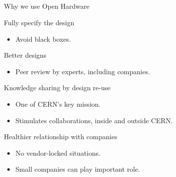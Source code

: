 \documentclass[compress,red]{beamer}
\begin{document}
\subsection*{} %

\begin{frame}{Why we use Open Hardware}

  \begin{block}{Fully specify the design}
    \begin{itemize}
    \item Avoid black boxes.
    \end{itemize}
  \end{block}

  \begin{block}{Better designs}
    \begin{itemize}
    \item Peer review by experts, including companies.
    \end{itemize}
  \end{block}

  \begin{block}{Knowledge sharing by design re-use}
    \begin{itemize}
    \item One of CERN's key mission.
    \item Stimulates collaborations, inside and outside CERN.
    \end{itemize}
  \end{block}

  \begin{block}{Healthier relationship with companies}
    \begin{itemize}
    \item No vendor-locked situations.
    \item Small companies can play important role.
    \end{itemize}
  \end{block}


\end{frame}
\end{document}
